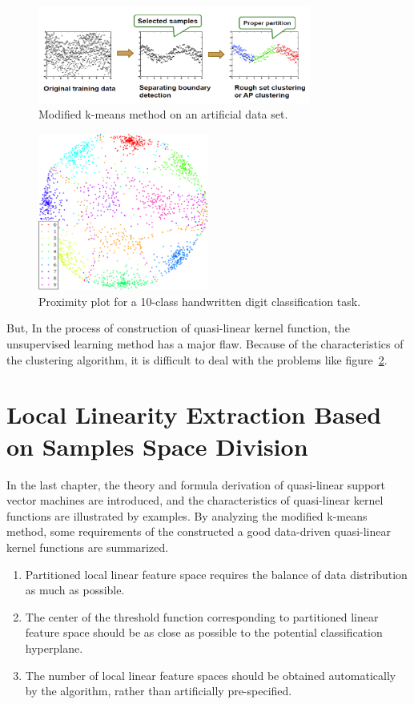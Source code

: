 \documentclass[master]{IPSstyle}
\begin{document}
{\begin{figure}[H]
    \centering
    \includegraphics[width=0.8\textwidth]{figures/ch2_kmeans_QLSVM.png}
    \caption{Modified k-means method on an artificial data set.}
    \label{fg:kmeans_QLSVM}
\end{figure}
\begin{figure}[H]
    \centering
    \includegraphics[width=0.5\textwidth]{figures/ch4_proximity_plot.pdf}
    \caption{Proximity plot for a 10-class handwritten digit classification task.}
    \label{fig:proximity-plot}
\end{figure}
But, In the process of construction of quasi-linear kernel function, the unsupervised learning method has a major flaw. Because of the characteristics of the clustering algorithm, it is difficult to deal with the problems like figure~\ref{fig:proximity-plot}.

\chapter{Local Linearity Extraction Based on Samples Space Division}
In the last chapter, the theory and formula derivation of quasi-linear support vector machines are introduced, and the characteristics of quasi-linear kernel functions are illustrated by examples. By analyzing the modified k-means method, some requirements of the constructed a good data-driven quasi-linear kernel functions are summarized.

\begin{enumerate}
\item Partitioned local linear feature space requires the balance of data distribution as much as possible.
\item The center of the threshold function corresponding to partitioned linear feature space should be as close as possible to the potential classification hyperplane.
\item The number of local linear feature spaces should be obtained automatically by the algorithm, rather than artificially pre-specified.
\end{enumerate} 

}
\end{document}
